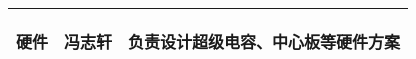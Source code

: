 \begin{longtable}{ p{2cm} | p{3.5cm} | p{9.3cm} |}
    \hline
    
        \begin{center}
            硬件
        \end{center}&
        \begin{center}
            冯志轩
        \end{center}&
        \begin{center}
            负责设计超级电容、中心板等硬件方案
        \end{center}\\

    \hline
    
\end{longtable}
